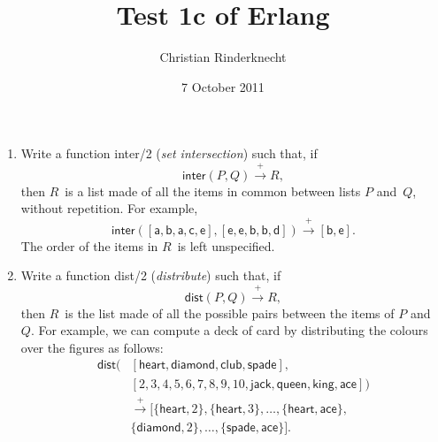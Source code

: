 \documentclass[11pt,a4paper]{article}
\title{Test 1c of \textsf{Erlang}}
\author{Christian Rinderknecht}
\date{7 October 2011}
\newcommand\fun[1]{\textsf{#1}}
\begin{document}
\maketitle

\thispagestyle{empty}

\begin{enumerate}

  \item Write a function \fun{inter/2} (\emph{set intersection}) such
    that, if \[\fun{inter}(P,Q) \xrightarrow{+} R,\] then \(R\)~is a
    list made of all the items in common between lists \(P\)
    and~\(Q\), without repetition. For example,
    \[\fun{inter}([\fun{a},\fun{b},\fun{a},\fun{c},\fun{e}],
                  [\fun{e},\fun{e},\fun{b},\fun{b},\fun{d}])
                  \xrightarrow{+} [\fun{b},\fun{e}].\] The order of
                  the items in \(R\)~is left unspecified.

  \item Write a function \fun{dist/2} (\emph{distribute}) such that,
    if \[\fun{dist}(P,Q) \xrightarrow{+} R,\] then \(R\)~is the list
    made of all the possible pairs between the items of \(P\)
    and~\(Q\). For example, we can compute a deck of card by
    distributing the colours over the figures as follows:
    \begin{align*}
      \fun{dist}(&[\fun{heart}, \fun{diamond}, \fun{club},
        \fun{spade}],\\
                 &[2, 3, 4, 5, 6, 7, 8, 9, 10, \fun{jack},
                    \fun{queen}, \fun{king},\fun{ace}])\\
      &\xrightarrow{+} 
    [\{\fun{heart}, 2\}, \{\fun{heart}, 3\}, \ldots, \{\fun{heart},
      \fun{ace}\},\\
     & \{\fun{diamond}, 2\}, \ldots, \{\fun{spade}, \fun{ace}\}].
    \end{align*}

\end{enumerate}
\end{document}
